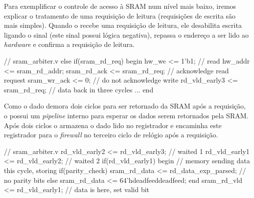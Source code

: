 
Para exemplificar o controle de acesso à SRAM num nível mais baixo,
iremos explicar o tratamento de uma requisição de leitura
(requisições de escrita são mais simples).  Quando o
 recebe uma requisição de leitura, ele desabilita
escrita ligando o sinal  (este sinal possui lógica
negativa), repassa o endereço a ser lido ao \emph{hardware} e
confirma a requisição de leitura.

\begin{verilogcode}
   // sram_arbiter.v
   else if(sram_rd_req) begin
      hw_we <= 1'b1;                // read
      hw_addr <= sram_rd_addr;
      sram_rd_ack <= sram_rd_req;   // acknowledge read request
      sram_wr_ack <= 0;             // do not acknowledge write
      rd_vld_early3 <= sram_rd_req; // data back in three cycles
      ...
   end
\end{verilogcode}

Como o dado demora dois ciclos para ser retornado da SRAM após a
requisição, o  possui um \emph{pipeline} interno
para esperar os dados serem retornados pela SRAM.  Após dois ciclos
o  armazena o dado lido no registrador
 e encaminha este registrador para o
\emph{firewall} no terceiro ciclo de relógio após a requisição.

\begin{verilogcode}
   // sram_arbiter.v
   rd_vld_early2 <= rd_vld_early3; // waited 1
   rd_vld_early1 <= rd_vld_early2; // waited 2
   if(rd_vld_early1) begin // memory sending data this cycle, storing
      if(parity_check)
         sram_rd_data <= rd_data_exp_parsed; // no parity bits
      else
         sram_rd_data <= 64'hdeadfeeddeadfeed;
   end
   sram_rd_vld <= rd_vld_early1;   // data is here, set valid bit
\end{verilogcode}
